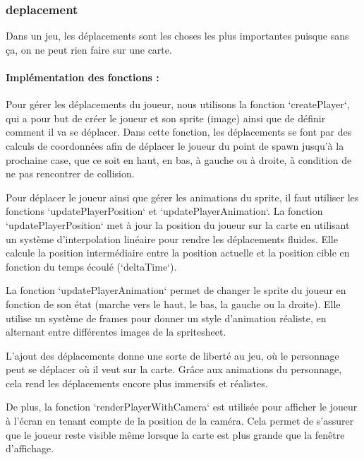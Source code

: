 \documentclass[12pt,a4paper, twoside]{article}
\begin{document}
    \newpage
    \subsubsection{deplacement}

    Dans un jeu, les déplacements sont les choses les plus importantes puisque sans ça, on ne peut rien faire sur une carte.

    \paragraph{Implémentation des fonctions : }

    Pour gérer les déplacements du joueur, nous utilisons la fonction `createPlayer`, qui a pour but de créer le joueur et son sprite (image) ainsi que de définir comment il va se déplacer. Dans cette fonction, les déplacements se font par des calculs de coordonnées afin de déplacer le joueur du point de spawn jusqu'à la prochaine case, que ce soit en haut, en bas, à gauche ou à droite, à condition de ne pas rencontrer de collision.
    \newline

    Pour déplacer le joueur ainsi que gérer les animations du sprite, il faut utiliser les fonctions `updatePlayerPosition` et `updatePlayerAnimation`. La fonction `updatePlayerPosition` met à jour la position du joueur sur la carte en utilisant un système d'interpolation linéaire pour rendre les déplacements fluides. Elle calcule la position intermédiaire entre la position actuelle et la position cible en fonction du temps écoulé (`deltaTime`).
    \newline

    La fonction `updatePlayerAnimation` permet de changer le sprite du joueur en fonction de son état (marche vers le haut, le bas, la gauche ou la droite). Elle utilise un système de frames pour donner un style d'animation réaliste, en alternant entre différentes images de la spritesheet.
    \newline

    L'ajout des déplacements donne une sorte de liberté au jeu, où le personnage peut se déplacer où il veut sur la carte. Grâce aux animations du personnage, cela rend les déplacements encore plus immersifs et réalistes.
    \newline

    De plus, la fonction `renderPlayerWithCamera` est utilisée pour afficher le joueur à l'écran en tenant compte de la position de la caméra. Cela permet de s'assurer que le joueur reste visible même lorsque la carte est plus grande que la fenêtre d'affichage.
    \newline
\end{document}

